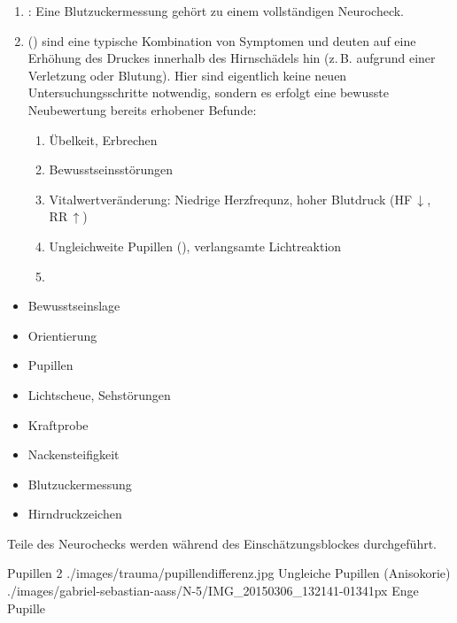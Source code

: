 {\begin{enumerate}
  Wenn eine Nackensteifigkeit vorliegt ist die Beugung nicht
  möglich und der Versuch schmerzhaft, der Patient bewegt
  evtl. den ganzen Rumpf mit. Die Bedeutung der
  Nackensteifigkeit wird unter 
  besprochen. , jedoch
  \item
  : Eine Blutzuckermessung gehört zu
  einem vollständigen Neurocheck.
  \item {} 
  ()  
  sind eine typische Kombination von Symptomen 
  und deuten auf eine Erhöhung des Druckes innerhalb des Hirnschädels hin 
  (z.\,B. aufgrund einer Verletzung oder Blutung).
  Hier sind eigentlich keine neuen Untersuchungsschritte notwendig, 
  sondern es erfolgt eine bewusste Neubewertung bereits erhobener Befunde:
  \begin{enumerate}
    \item Übelkeit, Erbrechen
    \item Bewusstseinsstörungen
    \item Vitalwertveränderung: 
    Niedrige Herzfrequnz, hoher Blutdruck (HF\,$\downarrow$, RR\,$\uparrow$)
    \item Ungleichweite Pupillen (), 
    verlangsamte Lichtreaktion
    \item {}
  \end{enumerate}
\end{enumerate}
}{
\begin{itemize}
  \item Bewusstseinslage
  \item Orientierung
  \item Pupillen
  \item Lichtscheue, Sehstörungen
  \item Kraftprobe
  \item Nackensteifigkeit
  \item[+] Blutzuckermessung
  \item Hirndruckzeichen
\end{itemize}

Teile des Neurochecks werden während des
Einschätzungsblockes
durchgeführt.
}{}{}{}



\begin{PictureSeriesWide}{}{Pupillen}
\PictureSeriesRowWide
{2}%
{./images/trauma/pupillendifferenz.jpg}%
{Ungleiche Pupillen (Anisokorie) 
\label{fig:anisokorie-bau}}%
{./images/gabriel-sebastian-aass/N-5/IMG_20150306_132141-01341px}%
{Enge Pupille 
}%
{}%
{}%
{}%
{}%
\end{PictureSeriesWide}




